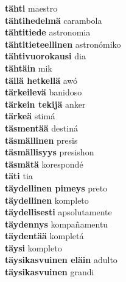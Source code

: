 \textbf{ tähti  } maestro \\
\textbf{ tähtihedelmä  } carambola \\
\textbf{ tähtitiede  } astronomia \\
\textbf{ tähtitieteellinen  } astronómiko \\
\textbf{ tähtivuorokausi  } dia \\
\textbf{ tähtäin  } mik \\
\textbf{ tällä hetkellä  } awó \\
\textbf{ tärkeilevä  } banidoso \\
\textbf{ tärkein tekijä  } anker \\
\textbf{ tärkeä  } stimá \\
\textbf{ täsmentää  } destiná \\
\textbf{ täsmällinen  } presis \\
\textbf{ täsmällisyys  } presishon \\
\textbf{ täsmätä  } korespondé \\
\textbf{ täti  } tia \\
\textbf{ täydellinen pimeys  } preto \\
\textbf{ täydellinen  } kompleto \\
\textbf{ täydellisesti  } apsolutamente \\
\textbf{ täydennys  } kompañamentu \\
\textbf{ täydentää  } kompletá \\
\textbf{ täysi  } kompleto \\
\textbf{ täysikasvuinen eläin  } adulto \\
\textbf{ täysikasvuinen  } grandi \\
